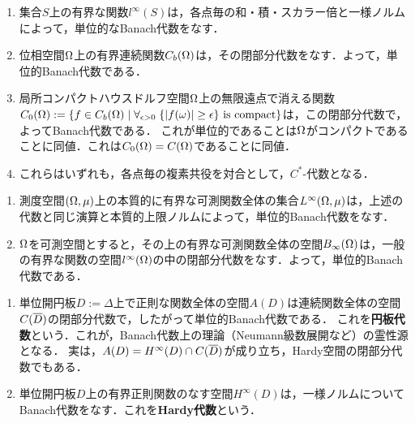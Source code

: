 \documentclass[uplatex,dvipdfmx]{jsreport}
\begin{document}
\begin{example}[位相空間上の関数の代数]\mbox{}
    \begin{enumerate}
        \item 集合$S$上の有界な関数$l^\infty(S)$は，各点毎の和・積・スカラー倍と一様ノルムによって，単位的なBanach代数をなす．
        \item 位相空間$\Omega$上の有界連続関数$C_b(\Omega)$は，その閉部分代数をなす．よって，単位的Banach代数である．
        \item 局所コンパクトハウスドルフ空間$\Omega$上の無限遠点で消える関数$C_0(\Omega):=\left\{f\in C_b(\Omega)\mid\forall_{\epsilon>0}\;\{\lvert f(\omega)\rvert\ge\epsilon\}\text{ is compact}\right\}$は，この閉部分代数で，よってBanach代数である．
        これが単位的であることは$\Omega$がコンパクトであることに同値．これは$C_0(\Omega)=C(\Omega)$であることに同値．
        \item これらはいずれも，各点毎の複素共役を対合として，$C^*$-代数となる．
    \end{enumerate}
\end{example}

\begin{example}[可測関数の代数]\mbox{}
    \begin{enumerate}
        \item 測度空間$(\Omega,\mu)$上の本質的に有界な可測関数全体の集合$L^\infty(\Omega,\mu)$は，上述の代数と同じ演算と本質的上限ノルムによって，単位的Banach代数をなす．
        \item $\Omega$を可測空間とすると，その上の有界な可測関数全体の空間$B_\infty(\Omega)$は，一般の有界な関数の空間$l^\infty(\Omega)$の中の閉部分代数をなす．よって，単位的Banach代数である．
    \end{enumerate}
\end{example}

\begin{example}\mbox{}
    \begin{enumerate}
        \item 単位開円板$D:=\Delta$上で正則な関数全体の空間$A(D)$は連続関数全体の空間$C(\overline{D})$の閉部分代数で，したがって単位的Banach代数である．
        これを\textbf{円板代数}という．これが，Banach代数上の理論（Neumann級数展開など）の霊性源となる．
        実は，$A(D)=H^\infty(D)\cap C(\overline{D})$が成り立ち，Hardy空間の閉部分代数でもある．
        \item 単位開円板$D$上の有界正則関数のなす空間$H^\infty(D)$は，一様ノルムについてBanach代数をなす．これを\textbf{Hardy代数}という．
    \end{enumerate}
\end{example}
\end{document}
